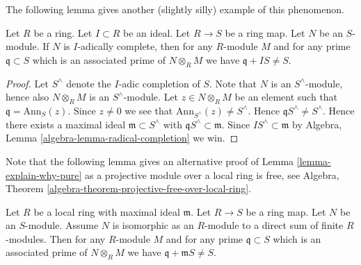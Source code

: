 \noindent
The following lemma gives another (slightly silly) example of this phenomenon.

\begin{lemma}
\label{lemma-explain-why-pure-complete}
Let $R$ be a ring. Let $I \subset R$ be an ideal.
Let $R \to S$ be a ring map. Let $N$ be an $S$-module.
If $N$ is $I$-adically complete, then for any $R$-module $M$ and
for any prime $\mathfrak q \subset S$ which is an associated prime of
$N \otimes_R M$ we have $\mathfrak q + I S \not = S$.
\end{lemma}

\begin{proof}
Let $S^\wedge$ denote the $I$-adic completion of $S$.
Note that $N$ is an $S^\wedge$-module, hence also
$N \otimes_R M$ is an $S^\wedge$-module.
Let $z \in N \otimes_R M$ be an element such that
$\mathfrak q = \text{Ann}_S(z)$. Since $z \not = 0$ we see
that $\text{Ann}_{S^\wedge}(z) \not = S^\wedge$. Hence
$\mathfrak q S^\wedge \not = S^\wedge$. Hence there exists a
maximal ideal $\mathfrak m \subset S^\wedge$ with
$\mathfrak q S^\wedge \subset \mathfrak m$. Since
$IS^\wedge \subset \mathfrak m$ by
Algebra, Lemma \ref{algebra-lemma-radical-completion}
we win.
\end{proof}

\noindent
Note that the following lemma gives an alternative proof of
Lemma \ref{lemma-explain-why-pure}
as a projective module over a local ring is free, see
Algebra, Theorem \ref{algebra-theorem-projective-free-over-local-ring}.

\begin{lemma}
\label{lemma-explain-why-pure-direct-sum-finite-modules}
Let $R$ be a local ring with maximal ideal $\mathfrak m$.
Let $R \to S$ be a ring map. Let $N$ be an $S$-module.
Assume $N$ is isomorphic as an $R$-module to a direct
sum of finite $R$-modules. Then for any $R$-module $M$ and
for any prime $\mathfrak q \subset S$ which is an associated prime of
$N \otimes_R M$ we have $\mathfrak q + \mathfrak m S \not = S$.
\end{lemma}

